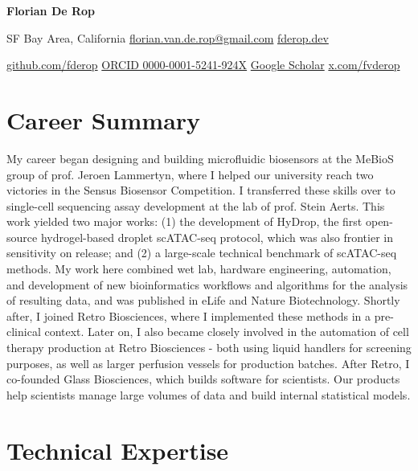 \documentclass[10pt]{scrartcl}
\begin{document}
\begin{center}
    {\Huge\bfseries Florian De Rop}\par
    \vspace{0.65em}
    SF Bay Area, California
    \enspace\textbullet\enspace
    \href{mailto:florian.van.de.rop@gmail.com}{florian.van.de.rop@gmail.com}
    \enspace\textbullet\enspace
    \href{https://fderop.dev}{fderop.dev}\par
    \href{https://github.com/fderop}{github.com/fderop}
    \enspace\textbullet\enspace
    \href{https://orcid.org/0000-0001-5241-924X}{ORCID 0000-0001-5241-924X}
    \enspace\textbullet\enspace
    \href{https://scholar.google.com/citations?user=Of7Z4ykAAAAJ&hl=en}{Google Scholar}
    \enspace\textbullet\enspace
    \href{https://x.com/fvderop}{x.com/fvderop}
\end{center}

\section{Career Summary}

My career began designing and building microfluidic biosensors at the MeBioS group of prof. Jeroen Lammertyn, where I helped our university reach two victories in the Sensus Biosensor Competition. I transferred these skills over to single-cell sequencing assay development at the lab of prof. Stein Aerts. This work yielded two major works: (1) the development of HyDrop, the first open-source hydrogel-based droplet scATAC-seq protocol, which was also frontier in sensitivity on release; and (2) a large-scale technical benchmark of scATAC-seq methods. My work here combined wet lab, hardware engineering, automation, and development of new bioinformatics workflows and algorithms for the analysis of resulting data, and was published in eLife and Nature Biotechnology. Shortly after, I joined Retro Biosciences, where I implemented these methods in a pre-clinical context. Later on, I also became closely involved in the automation of cell therapy production at Retro Biosciences - both using liquid handlers for screening purposes, as well as larger perfusion vessels for production batches. After Retro, I co-founded Glass Biosciences, which builds software for scientists. Our products help scientists manage large volumes of data and build internal statistical models.

\section{Technical Expertise}
\end{document}
